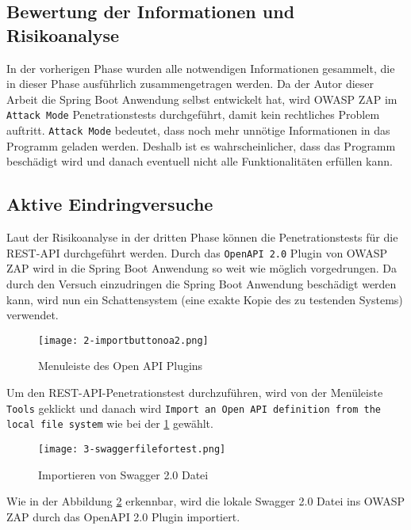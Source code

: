 \subsection{Bewertung der Informationen und Risikoanalyse}

In der vorherigen Phase wurden alle notwendigen Informationen gesammelt, die in dieser Phase ausführlich zusammengetragen werden. Da der Autor dieser Arbeit die Spring Boot Anwendung selbst entwickelt hat, wird OWASP ZAP im \texttt{Attack Mode} Penetrationstests durchgeführt, damit kein rechtliches Problem auftritt. \texttt{Attack Mode} bedeutet, dass noch mehr unnötige Informationen in das Programm geladen werden. Deshalb ist es wahrscheinlicher, dass das Programm beschädigt wird und danach eventuell nicht alle Funktionalitäten erfüllen kann.

\subsection{Aktive Eindringversuche}

Laut der Risikoanalyse in der dritten Phase können die Penetrationstests für die REST-API durchgeführt werden. Durch das \texttt{OpenAPI 2.0} Plugin von OWASP ZAP wird in die Spring Boot Anwendung so weit wie möglich vorgedrungen. Da durch den Versuch einzudringen die Spring Boot Anwendung beschädigt werden kann, wird nun ein Schattensystem (eine exakte Kopie des zu testenden Systems) verwendet.\\

\newpage

\begin{figure}[h]
	\centering
	\texttt{[image: 2-importbuttonoa2.png]}
	\caption{Menuleiste des Open API Plugins}
	\label{swaggerimport1}
\end{figure}

Um den REST-API-Penetrationstest durchzuführen, wird von der Menüleiste \texttt{Tools} geklickt und danach wird \texttt{Import an Open API definition from the local file system} wie bei der \ref{swaggerimport1} gewählt.

\begin{figure}[h]
	\centering
	\texttt{[image: 3-swaggerfilefortest.png]}
	\caption{Importieren von Swagger 2.0 Datei}
	\label{swaggerimport2}
\end{figure}


Wie in der Abbildung \ref{swaggerimport2} erkennbar, wird die lokale Swagger 2.0 Datei ins OWASP ZAP durch das OpenAPI 2.0 Plugin importiert.

